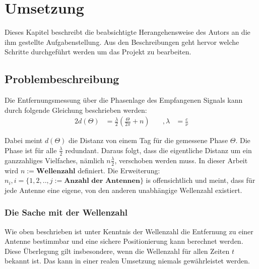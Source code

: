 \documentclass[a4paper,12pt,fleqn]{article}
\begin{document}
\section{Umsetzung}
Dieses Kapitel beschreibt die beabsichtigte Herangehensweise des Autors an die
ihm gestellte Aufgabenstellung. Aus den Beschreibungen geht hervor welche Schritte durchgeführt werden um das Projekt zu bearbeiten.
%
\subsection{Problembeschreibung}
%
Die Entfernungsmessung über die Phasenlage des Empfangenen Signals kann durch folgende Gleichung beschrieben werden:
\begin{alignat}{2}\label{eq:Wavenumbers}
 	d(\Theta)&=\frac{\lambda}{2}(\frac{\Theta}{2\pi}+n) &\quad
 	,\lambda&=\frac{c}{\nu}
\end{alignat}

Dabei meint $d(\Theta)$ die Distanz von einem Tag für die gemessene Phase $\Theta$. Die Phase ist für alle $\frac{\lambda}{2}$ redundant. Daraus folgt, dass die eigentliche Distanz um ein ganzzahliges Vielfaches, nämlich $n\frac{\lambda}{2}$, verschoben werden muss. In dieser Arbeit wird $n := \textbf{Wellenzahl}$ definiert. Die Erweiterung: $n_i, i = \{1,2,..,j := \textbf{Anzahl der Antennen}\}$ is offensichtlich und meint, dass für jede Antenne eine eigene, von den anderen unabhängige Wellenzahl existiert. 
%
\subsubsection{Die Sache mit der Wellenzahl}
%
Wie oben beschrieben ist unter Kenntnis der Wellenzahl die Entfernung zu einer Antenne bestimmbar und eine sichere Positionierung kann berechnet werden. Diese Überlegung gilt insbesondere, wenn die Wellenzahl für allen Zeiten $t$ bekannt ist. Das kann in einer realen Umsetzung niemals gewährleistet werden.
%
\end{document}

